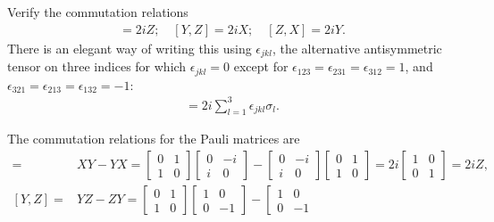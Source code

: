 \documentclass[en]{sol-man}
\begin{document}
\begin{exe}
    Verify the commutation relations
    \begin{align}
        [X,Y]=2iZ;\quad[Y,Z]=2iX;\quad[Z,X]=2iY.
    \end{align}
    There is an elegant way of writing this using $\epsilon_{jkl}$, the alternative antisymmetric tensor on three indices for which $\epsilon_{jkl}=0$ except for $\epsilon_{123}=\epsilon_{231}=\epsilon_{312}=1$, and $\epsilon_{321}=\epsilon_{213}=\epsilon_{132}=-1$:
    \begin{align}
        [\sigma_j,\sigma_k]=2i\sum_{l=1}^3\epsilon_{jkl}\sigma_l.
    \end{align}
\end{exe}
\begin{pf}
    The commutation relations for the Pauli matrices are
    \begin{align}
        [X,Y]=&XY-YX=\left[\begin{matrix}
            0&1\\
            1&0
        \end{matrix}\right]\left[\begin{matrix}
            0&-i\\
            i&0
        \end{matrix}\right]-\left[\begin{matrix}
            0&-i\\
            i&0
        \end{matrix}\right]\left[\begin{matrix}
            0&1\\
            1&0
        \end{matrix}\right]=2i\left[\begin{matrix}
            1&0\\
            0&1
        \end{matrix}\right]=2iZ,\\
        [Y,Z]=&YZ-ZY=\left[\begin{matrix}
            0&1\\
            1&0
        \end{matrix}\right]\left[\begin{matrix}
            1&0\\
            0&-1
        \end{matrix}\right]-\left[\begin{matrix}
            1&0\\
            0&-1

\end{matrix}
\end{align}
\end{pf}
\end{document}

